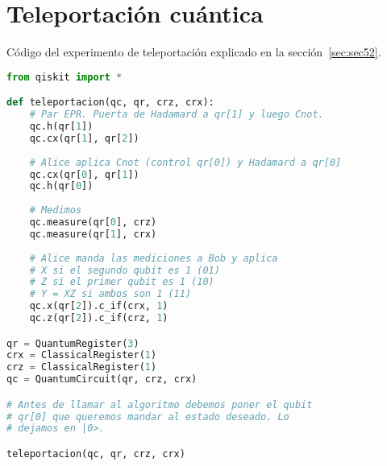 \section{Teleportación cuántica}
\label{sec:seca2}
Código del experimento de teleportación explicado en la sección~\ref{sec:sec52}.
\begin{lstlisting}[language=Python]
from qiskit import *

def teleportacion(qc, qr, crz, crx):
    # Par EPR. Puerta de Hadamard a qr[1] y luego Cnot.
    qc.h(qr[1])
    qc.cx(qr[1], qr[2])
    
    # Alice aplica Cnot (control qr[0]) y Hadamard a qr[0]
    qc.cx(qr[0], qr[1])
    qc.h(qr[0])
    
    # Medimos
    qc.measure(qr[0], crz)
    qc.measure(qr[1], crx)
        
    # Alice manda las mediciones a Bob y aplica
    # X si el segundo qubit es 1 (01)
    # Z si el primer qubit es 1 (10)
    # Y = XZ si ambos son 1 (11)
    qc.x(qr[2]).c_if(crx, 1)
    qc.z(qr[2]).c_if(crz, 1)

qr = QuantumRegister(3)
crx = ClassicalRegister(1)
crz = ClassicalRegister(1)
qc = QuantumCircuit(qr, crz, crx)

# Antes de llamar al algoritmo debemos poner el qubit
# qr[0] que queremos mandar al estado deseado. Lo
# dejamos en |0>.

teleportacion(qc, qr, crz, crx)
\end{lstlisting}

